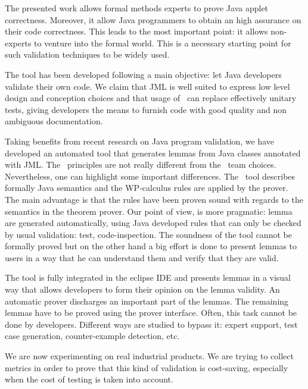 \label{Conclusion}
 The presented work allows formal methods experts to prove Java applet correctness.
 Moreover, it allow Java programmers to obtain an high assurance on their code correctness.
 This leads to the most important point:
it allows non-experts to venture into the formal world.  This is a necessary starting point for such validation
techniques to be widely used.

  The tool has been developed following a main
 objective: let Java developers validate their own code.  We claim
 that JML is well suited to express low level design and conception
 choices and that usage of \JACK\ can replace effectively unitary tests,
 giving developers the means to furnish code with good quality
 and non ambiguous documentation.

 Taking benefits from recent research on Java program validation, we have
 developed an automated tool that generates lemmas from Java classes
 annotated with JML.
 The \JACK\ principles are not really different from the \LOOP\
 team choices.  Nevertheless, one can highlight some important
 differences.
 The \LOOP\ tool describes formally Java semantics and the WP-calculus rules are applied by the prover.
 The main advantage is that the rules have been proven sound with regards to the semantics in the theorem prover.
 Our point of view, is more pragmatic: lemma are generated automatically, using
 Java developed rules that can only be checked by usual validation: test, code-inspection.
 The soundness of the tool cannot be formally proved but on the other hand a big effort is done to present
 lemmas to users in a way that he can understand them and verify
 that they are valid.

 The tool is fully integrated in the eclipse IDE
 and presents lemmas in a visual way that allows developers to form their
 opinion on the lemma validity.  An automatic prover discharges an
 important part of the lemmas.  The remaining lemmas have to be proved
 using the prover interface.  Often, this task cannot be done by developers.
 Different ways are studied to bypass it: expert support, test case
 generation, counter-example detection, etc.

 We are now experimenting on real industrial products.  We are
 trying to collect metrics in order to prove that this kind of
 validation is cost-saving, especially when the cost of testing is
 taken into account.
